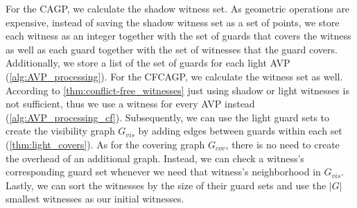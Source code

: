 For the CAGP, we calculate the shadow witness set. As geometric operations are expensive, instead of saving the shadow witness set as a set of points, we store each witness as an integer together with the set of guards that covers the witness as well as each guard together with the set of witnesses that the guard covers. Additionally, we store a list of the set of guards for each light AVP (\cref{alg:AVP_processing}). For the CFCAGP, we calculate the witness set as well. According to \cref{thm:conflict-free_witnesses} just using shadow or light witnesses is not sufficient, thus we use a witness for every AVP instead (\cref{alg:AVP_processing_cf}). Subsequently, we can use the light guard sets to create the visibility graph $G_{vis}$ by adding edges between guards within each set (\cref{thm:light_covers}). As for the covering graph $G_{cov}$, there is no need to create the overhead of an additional graph. Instead, we can check a witness's corresponding guard set whenever we need that witness's neighborhood in $G_{vis}$. Lastly, we can sort the witnesses by the size of their guard sets and use the $|G|$ smallest witnesses as our initial witnesses.


